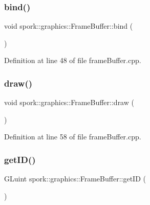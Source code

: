 \subsubsection{\texorpdfstring{bind()}{bind()}}
{\footnotesize\ttfamily void spork\+::graphics\+::\+Frame\+Buffer\+::bind (\begin{DoxyParamCaption}{ }\end{DoxyParamCaption})\hspace{0.3cm}{\ttfamily [private]}}



Definition at line 48 of file frame\+Buffer.\+cpp.

\mbox{\label{classspork_1_1graphics_1_1_frame_buffer_a98e8ac4671cc62e09bba3ceff5c36adc}} 
\subsubsection{\texorpdfstring{draw()}{draw()}}
{\footnotesize\ttfamily void spork\+::graphics\+::\+Frame\+Buffer\+::draw (\begin{DoxyParamCaption}{ }\end{DoxyParamCaption})\hspace{0.3cm}{\ttfamily [private]}}



Definition at line 58 of file frame\+Buffer.\+cpp.

\mbox{\label{classspork_1_1graphics_1_1_frame_buffer_a4544b8c2ffe1ea1a248750c0b3c87f57}} 
\subsubsection{\texorpdfstring{get\+I\+D()}{getID()}}
{\footnotesize\ttfamily G\+Luint spork\+::graphics\+::\+Frame\+Buffer\+::get\+ID (\begin{DoxyParamCaption}{ }\end{DoxyParamCaption})\hspace{0.3cm}{\ttfamily [inline]}}



